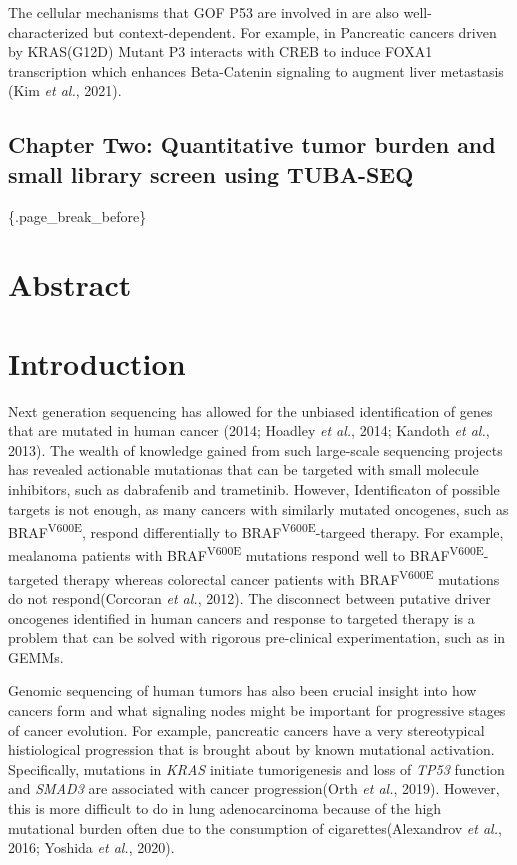 The cellular mechanisms that GOF P53 are involved in are also well-characterized but context-dependent. For example, in Pancreatic cancers driven by KRAS(G12D) Mutant P3 interacts with CREB to induce FOXA1 transcription which enhances Beta-Catenin signaling to augment liver metastasis (Kim \emph{et al.}, 2021).

\hypertarget{chapter-two-quantitative-tumor-burden-and-small-library-screen-using-tuba-seq}{%
\subsection{Chapter Two: Quantitative tumor burden and small library screen using TUBA-SEQ}\label{chapter-two-quantitative-tumor-burden-and-small-library-screen-using-tuba-seq}}

\{.page\_break\_before\}

\hypertarget{abstract}{%
\section{Abstract}\label{abstract}}

\hypertarget{introduction}{%
\section{Introduction}\label{introduction}}

Next generation sequencing has allowed for the unbiased identification of genes that are mutated in human cancer (2014; Hoadley \emph{et al.}, 2014; Kandoth \emph{et al.}, 2013).
The wealth of knowledge gained from such large-scale sequencing projects has revealed actionable mutationas that can be targeted with small molecule inhibitors, such as dabrafenib and trametinib.
However, Identificaton of possible targets is not enough, as many cancers with similarly mutated oncogenes, such as BRAF\textsuperscript{V600E}, respond differentially to BRAF\textsuperscript{V600E}-targeed therapy.
For example, mealanoma patients with BRAF\textsuperscript{V600E} mutations respond well to BRAF\textsuperscript{V600E}-targeted therapy whereas colorectal cancer patients with BRAF\textsuperscript{V600E} mutations do not respond(Corcoran \emph{et al.}, 2012).
The disconnect between putative driver oncogenes identified in human cancers and response to targeted therapy is a problem that can be solved with rigorous pre-clinical experimentation, such as in GEMMs.

Genomic sequencing of human tumors has also been crucial insight into how cancers form and what signaling nodes might be important for progressive stages of cancer evolution.
For example, pancreatic cancers have a very stereotypical histiological progression that is brought about by known mutational activation.
Specifically, mutations in \emph{KRAS} initiate tumorigenesis and loss of \emph{TP53} function and \emph{SMAD3} are associated with cancer progression(Orth \emph{et al.}, 2019).
However, this is more difficult to do in lung adenocarcinoma because of the high mutational burden often due to the consumption of cigarettes(Alexandrov \emph{et al.}, 2016; Yoshida \emph{et al.}, 2020).

